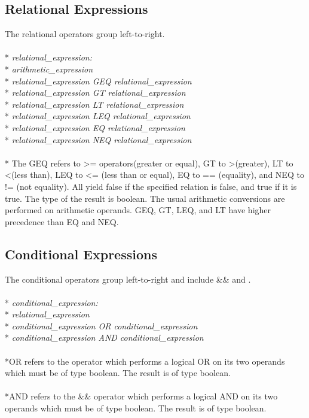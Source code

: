 \documentclass[11pt]{article}
\newcommand{\tab}{\hspace*{2em}}
\begin{document}
\subsection{Relational Expressions}
The relational operators group left-to-right.
\\ \\* \tab \emph{relational\_expression:}
\\* \tab \tab \emph{arithmetic\_expression}
\\* \tab \tab \emph{relational\_expression GEQ relational\_expression}
\\* \tab \tab \emph{relational\_expression GT relational\_expression}
\\* \tab \tab \emph{relational\_expression LT relational\_expression}
\\* \tab \tab \emph{relational\_expression LEQ relational\_expression}
\\* \tab \tab \emph{relational\_expression EQ relational\_expression}
\\* \tab \tab \emph{relational\_expression NEQ relational\_expression}
\\ \\* The GEQ refers to \textgreater= operators(greater or equal), GT to \textgreater (greater), LT to \textless (less than), LEQ to \textless= (less than or equal), EQ to == (equality), and NEQ to != (not equality). All yield false if the specified relation is false, and true if it is true. The type of the result is boolean. The usual arithmetic conversions are performed on arithmetic operands. GEQ, GT, LEQ, and LT have higher precedence than EQ and NEQ.

\subsection{Conditional Expressions}
The conditional operators group left-to-right and include \&\& and \textbar\textbar.
\\ \\* \tab \emph{conditional\_expression:}
\\* \tab \tab \emph{relational\_expression}
\\* \tab \tab \emph{conditional\_expression OR conditional\_expression}
\\* \tab \tab \emph{conditional\_expression AND conditional\_expression}
\\ \\*OR refers to the \textbar\textbar operator which performs a logical OR on its two operands which must be of type boolean. The result is of type boolean. 
\\ \\*AND refers to the \&\& operator which performs a logical AND on its two operands which must be of type boolean. The result is of type boolean.
\end{document}
